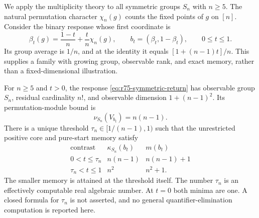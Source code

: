 We apply the multiplicity theory to all symmetric groups $S_n$ with
$n\ge5$. The natural permutation character $\chi_n(g)$ counts the
fixed points of $g$ on $[n]$. Consider the binary response whose first
coordinate is
\begin{equation}\label{eq:r75-symmetric-return}
 \beta_t(g)=\frac{1-t}{n}+\frac{t}{n}\chi_n(g),
 \qquad b_t=(\beta_t,1-\beta_t),\qquad0\le t\le1.
\end{equation}
Its group average is $1/n$, and at the identity it equals
$[1+(n-1)t]/n$. This supplies a family with growing group, observable
rank, and exact memory, rather than a fixed-dimensional illustration.

\begin{theorem}
\label{thm:r75-symmetric-return}
For $n\ge5$ and $t>0$, the response \eqref{eq:r75-symmetric-return}
has observable group $S_n$, residual cardinality $n!$, and observable
dimension $1+(n-1)^2$. Its permutation-module bound is
\[
 \nu_{S_n}(V_{b_t})=n(n-1).
\]
There is a unique threshold
$\tau_n\in[1/(n-1),1)$ such that the unrestricted positive core and
pure-start memory satisfy
\[
 \begin{array}{c|c|c}
 \text{contrast}&\kappa_{S_n}(b_t)&m(b_t)\\\hline
 0<t\le\tau_n&n(n-1)&n(n-1)+1\\
 \tau_n<t\le1&n^2&n^2+1.
 \end{array}
\]
The smaller memory is attained at the threshold itself. The number
$\tau_n$ is an effectively computable real algebraic number. At $t=0$
both minima are one. A closed formula for $\tau_n$ is not asserted,
and no general quantifier-elimination computation is reported here.
\end{theorem}
